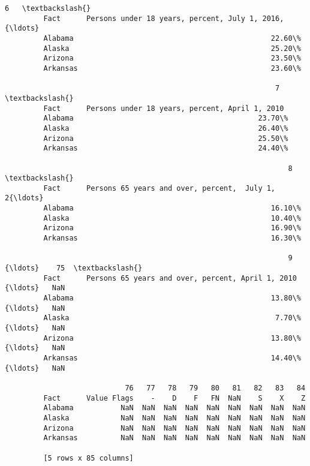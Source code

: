 \documentclass[11pt]{article}
\begin{document}
\begin{Verbatim}[commandchars=\\\{\}]
                                                                  6   \textbackslash{}
         Fact      Persons under 18 years, percent, July 1, 2016,{\ldots}   
         Alabama                                              22.60\%   
         Alaska                                               25.20\%   
         Arizona                                              23.50\%   
         Arkansas                                             23.60\%   
         
                                                               7   \textbackslash{}
         Fact      Persons under 18 years, percent, April 1, 2010   
         Alabama                                           23.70\%   
         Alaska                                            26.40\%   
         Arizona                                           25.50\%   
         Arkansas                                          24.40\%   
         
                                                                  8   \textbackslash{}
         Fact      Persons 65 years and over, percent,  July 1, 2{\ldots}   
         Alabama                                              16.10\%   
         Alaska                                               10.40\%   
         Arizona                                              16.90\%   
         Arkansas                                             16.30\%   
         
                                                                  9  {\ldots}    75  \textbackslash{}
         Fact      Persons 65 years and over, percent, April 1, 2010 {\ldots}   NaN   
         Alabama                                              13.80\% {\ldots}   NaN   
         Alaska                                                7.70\% {\ldots}   NaN   
         Arizona                                              13.80\% {\ldots}   NaN   
         Arkansas                                             14.40\% {\ldots}   NaN   
         
                            76   77   78   79   80   81   82   83   84  
         Fact      Value Flags    -    D    F   FN  NaN    S    X    Z  
         Alabama           NaN  NaN  NaN  NaN  NaN  NaN  NaN  NaN  NaN  
         Alaska            NaN  NaN  NaN  NaN  NaN  NaN  NaN  NaN  NaN  
         Arizona           NaN  NaN  NaN  NaN  NaN  NaN  NaN  NaN  NaN  
         Arkansas          NaN  NaN  NaN  NaN  NaN  NaN  NaN  NaN  NaN  
         
         [5 rows x 85 columns]
\end{Verbatim}
            
\end{document}
